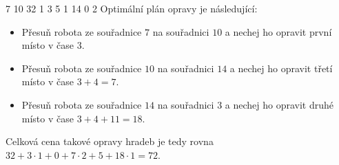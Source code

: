  7
10 32 1
3 5 1
14 0 2
\sampleCOMMENT
Optimální plán opravy je následující:
\begin{itemize}
	\item Přesuň robota ze souřadnice $7$ na souřadnici $10$ a nechej ho opravit první místo v čase $3$.
	\item Přesuň robota ze souřadnice $10$ na souřadnici $14$ a nechej ho opravit třetí místo v čase $3 + 4 = 7$.
	\item Přesuň robota ze souřadnice $14$ na souřadnici $3$ a nechej ho opravit druhé místo v čase $3 + 4 + 11 = 18$.
\end{itemize}
Celková cena takové opravy hradeb je tedy rovna\\
$32 + 3 \cdot 1 + 0 + 7 \cdot 2 + 5 + 18 \cdot 1 = 72$.
\sampleEND



